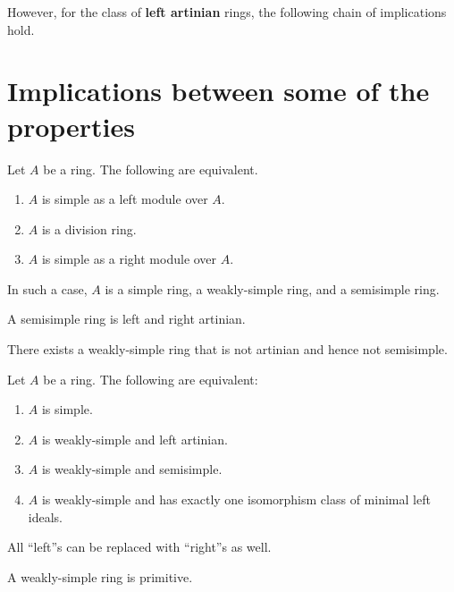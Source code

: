 \documentclass[12pt]{article}
\begin{document}
However, for the class of \textbf{{\color{red}left artinian}} rings, the following chain of implications hold.


\section{Implications between some of the properties}

\begin{thm} \label{thm:simple-as-a-module}
	Let $A$ be a ring. The following are equivalent.
	\begin{enumerate}[label=(\alph*)]
		\item $A$ is simple as a left module over $A$.
		\item $A$ is a division ring.
		\item $A$ is simple as a right module over $A$.
	\end{enumerate}
	In such a case, $A$ is a simple ring, a weakly-simple ring, and a semisimple ring.
\end{thm}

\begin{thm} \label{thm:semismimple-implies-artinian}
	A semisimple ring is left and right artinian.
\end{thm}

\begin{thm} \label{thm:weakly-simple-not-semisimple}
	There exists a weakly-simple ring that is not artinian and hence not semisimple.
\end{thm}

\begin{thm} \label{thm:simple-equivalences-with-semisimple}
	Let $A$ be a ring. The following are equivalent:
	\begin{enumerate}[label=(\alph*)]
		\item $A$ is simple.
		\item $A$ is weakly-simple and left artinian.
		\item $A$ is weakly-simple and semisimple.
		\item $A$ is weakly-simple and has exactly one isomorphism class of minimal left ideals.
	\end{enumerate}
	All ``left''s can be replaced with ``right''s as well.
\end{thm}

\begin{thm}
	A weakly-simple ring is primitive.
\end{thm}
\end{document}
